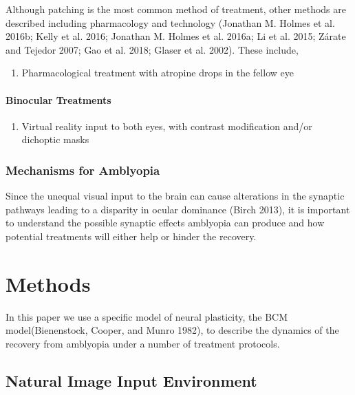 \documentclass[
  letterpaper,
  DIV=11,
  numbers=noendperiod]{scrreprt}
\providecommand{\tightlist}{%
  \setlength{\itemsep}{0pt}\setlength{\parskip}{0pt}}\usepackage{longtable,booktabs,array}
\begin{document}
Although patching is the most common method of treatment, other methods
are described including pharmacology and technology (Jonathan M. Holmes
et al. 2016b; Kelly et al. 2016; Jonathan M. Holmes et al. 2016a; Li et
al. 2015; Zárate and Tejedor 2007; Gao et al. 2018; Glaser et al. 2002).
These include,

\begin{enumerate}
\def\labelenumi{\arabic{enumi}.}
\setcounter{enumi}{2}
\tightlist
\item
  Pharmacological treatment with atropine drops in the fellow eye
\end{enumerate}

\hypertarget{binocular-treatments}{%
\subsection{Binocular Treatments}\label{binocular-treatments}}

\begin{enumerate}
\def\labelenumi{\arabic{enumi}.}
\setcounter{enumi}{3}
\tightlist
\item
  Virtual reality input to both eyes, with contrast modification and/or
  dichoptic masks
\end{enumerate}

\hypertarget{mechanisms-for-amblyopia}{%
\section{Mechanisms for Amblyopia}\label{mechanisms-for-amblyopia}}

Since the unequal visual input to the brain can cause alterations in the
synaptic pathways leading to a disparity in ocular dominance (Birch
2013), it is important to understand the possible synaptic effects
amblyopia can produce and how potential treatments will either help or
hinder the recovery.

\part{Methods}

In this paper we use a specific model of neural plasticity, the BCM
model(Bienenstock, Cooper, and Munro 1982), to describe the dynamics of
the recovery from amblyopia under a number of treatment protocols.

\hypertarget{natural-image-input-environment}{%
\chapter{Natural Image Input
Environment}\label{natural-image-input-environment}}
\end{document}
